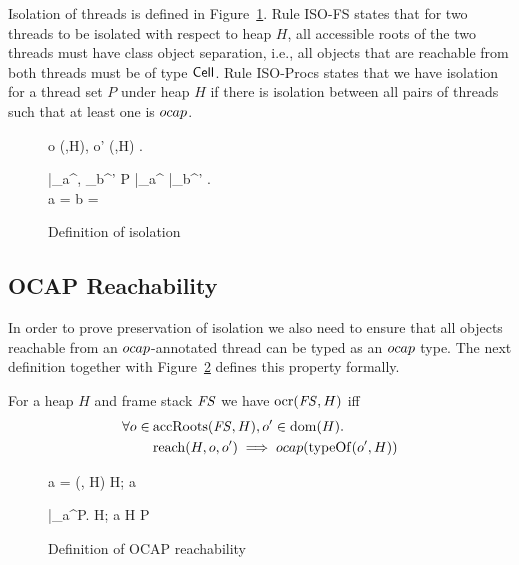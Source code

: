 Isolation of threads is defined in Figure~\ref{fig:def_isolation}. Rule {\sc
ISO-FS} states that for two threads to be isolated with respect to heap $H$, all
accessible roots of the two threads must have class object separation, i.e., 
all objects that are reachable from both threads must be of type $\mbox{$\mathsf{Cell}$}$.
Rule {\sc ISO-Procs} states that we have isolation for a thread set $P$ under
heap $H$ if there is isolation between all pairs of threads such that at least
one is $\mbox{$ocap$}$.

\begin{figure}
  { 
    \forall o \in \accRoots(\FS,H), o' \in \accRoots(\GS,H) . \: 
  }
  {
  }
  
  \RuleSpace{}

  {
    \forall \FS|_a^\iota, \GS_b^{\iota'} \in P  \FS|_a^\iota \neq
    \GS|_b^{\iota'} . \\
    a = \ocap \: \lor \: b = \ocap \implies {}
  }
  {
  }
  \caption{Definition of isolation}
  \label{fig:def_isolation}
\end{figure}

\subsection{OCAP Reachability}%
\label{sub:ocap_reachability}

In order to prove preservation of isolation we also need to ensure that all
objects reachable from an $\mbox{$ocap$}$-annotated thread can be typed as an $\mbox{$ocap$}$
type. The next definition together with Figure~\ref{fig:def_ocapreach} defines
this property formally.
\begin{definition}
  For a heap $H$ and frame stack $\mathit{FS}$ we have $\mbox{$\mathrm{ocr}$}{(\ensuremath{\mathit{FS}},H)}$ iff
  \begin{align}
    \label{eq:ocr_def}
    \forall o \in \: &\mbox{$\mathrm{accRoots}$}(\mathit{FS},H), o' \in \mbox{$\mathrm{dom}$}(H). \notag\\
    &\mbox{$\mathrm{reach}$}{(H, o, o')} \implies \mbox{$ocap$}{(\mbox{$\mathrm{typeOf}$}{(o', H)})}
  \end{align}
\end{definition}

\begin{figure}
  { a = \ocap \implies \ocrloc(\FS, H) }
  { H; a \vdash \FS \tsep \ocr }

  \RuleSpace{}

  {\forall \FS|_a^\iota \in P. \: H; a \vdash \FS \tsep \ocr}
  {H \vdash P \tsep \ocr}

  \caption{Definition of OCAP reachability}
  \label{fig:def_ocapreach}
\end{figure}

